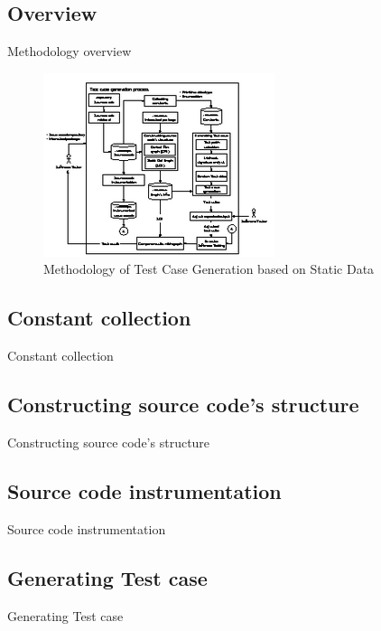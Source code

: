 \documentclass{beamer}
\begin{document}
\subsection{Overview}
\begin{frame}{Methodology overview}
    \begin{figure}
        \includegraphics[height=0.65\paperheight]{figure/Methodology.eps}
        \caption{Methodology of Test Case Generation based on Static Data}
        \label{fig:methodologyOverview}
    \end{figure}
\end{frame}

\subsection{Constant collection}
\begin{frame}{Constant collection}
\end{frame}

\subsection{Constructing source code's structure}
\begin{frame}{Constructing source code's structure}
\end{frame}

\subsection{Source code instrumentation}
\begin{frame}{Source code instrumentation}
\end{frame}

\subsection{Generating Test case}
\begin{frame}{Generating Test case}
\end{frame}
\end{document}
